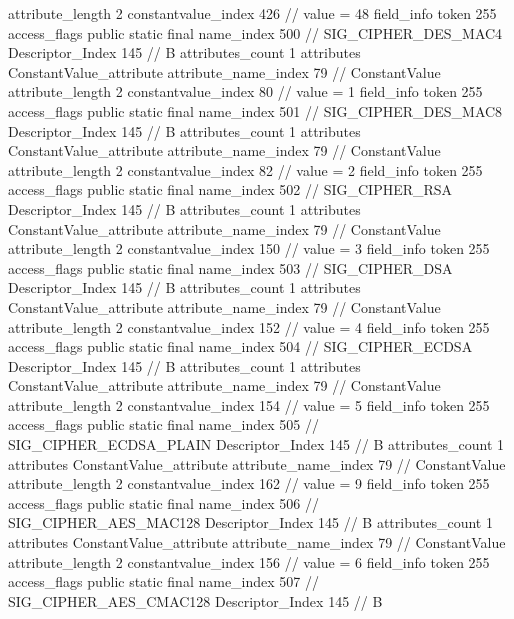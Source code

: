 {{{{{{{					attribute_length	2
					constantvalue_index	426		// value = 48
				}
				}
			}
			field_info {
				token	255
				access_flags	public static final
				name_index	500		// SIG_CIPHER_DES_MAC4
				Descriptor_Index	145		// B
				attributes_count	1
				attributes {
				ConstantValue_attribute {
					attribute_name_index	79		// ConstantValue
					attribute_length	2
					constantvalue_index	80		// value = 1
				}
				}
			}
			field_info {
				token	255
				access_flags	public static final
				name_index	501		// SIG_CIPHER_DES_MAC8
				Descriptor_Index	145		// B
				attributes_count	1
				attributes {
				ConstantValue_attribute {
					attribute_name_index	79		// ConstantValue
					attribute_length	2
					constantvalue_index	82		// value = 2
				}
				}
			}
			field_info {
				token	255
				access_flags	public static final
				name_index	502		// SIG_CIPHER_RSA
				Descriptor_Index	145		// B
				attributes_count	1
				attributes {
				ConstantValue_attribute {
					attribute_name_index	79		// ConstantValue
					attribute_length	2
					constantvalue_index	150		// value = 3
				}
				}
			}
			field_info {
				token	255
				access_flags	public static final
				name_index	503		// SIG_CIPHER_DSA
				Descriptor_Index	145		// B
				attributes_count	1
				attributes {
				ConstantValue_attribute {
					attribute_name_index	79		// ConstantValue
					attribute_length	2
					constantvalue_index	152		// value = 4
				}
				}
			}
			field_info {
				token	255
				access_flags	public static final
				name_index	504		// SIG_CIPHER_ECDSA
				Descriptor_Index	145		// B
				attributes_count	1
				attributes {
				ConstantValue_attribute {
					attribute_name_index	79		// ConstantValue
					attribute_length	2
					constantvalue_index	154		// value = 5
				}
				}
			}
			field_info {
				token	255
				access_flags	public static final
				name_index	505		// SIG_CIPHER_ECDSA_PLAIN
				Descriptor_Index	145		// B
				attributes_count	1
				attributes {
				ConstantValue_attribute {
					attribute_name_index	79		// ConstantValue
					attribute_length	2
					constantvalue_index	162		// value = 9
				}
				}
			}
			field_info {
				token	255
				access_flags	public static final
				name_index	506		// SIG_CIPHER_AES_MAC128
				Descriptor_Index	145		// B
				attributes_count	1
				attributes {
				ConstantValue_attribute {
					attribute_name_index	79		// ConstantValue
					attribute_length	2
					constantvalue_index	156		// value = 6
				}
				}
			}
			field_info {
				token	255
				access_flags	public static final
				name_index	507		// SIG_CIPHER_AES_CMAC128
				Descriptor_Index	145		// B
}}}}}
